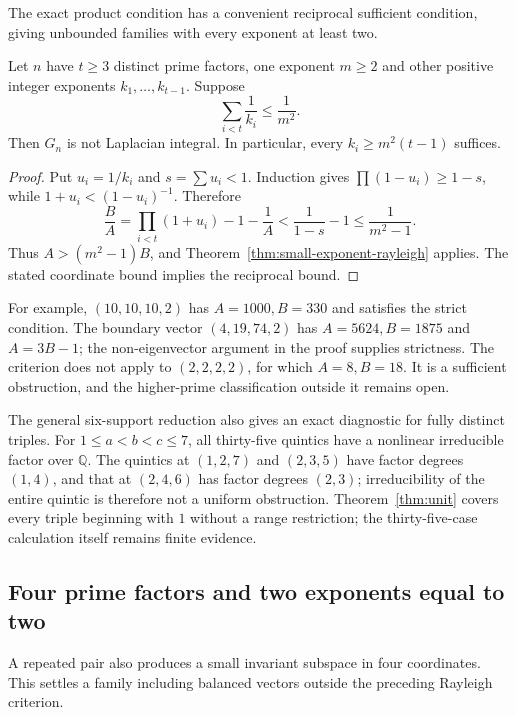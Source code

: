 The exact product condition has a convenient reciprocal sufficient
condition, giving unbounded families with every exponent at least two.

\begin{corollary}
\label{cor:small-exponent-reciprocal}
Let $n$ have $t\geq3$ distinct prime factors, one exponent $m\geq2$
and other positive integer exponents $k_1,\ldots,k_{t-1}$.
Suppose
\[
 \sum_{i<t}\frac1{k_i}\leq\frac1{m^2}.
\]
Then $G_n$ is not Laplacian integral. In particular, every
$k_i\geq m^2(t-1)$ suffices.
\end{corollary}
\begin{proof}
Put $u_i=1/k_i$ and $s=\sum u_i<1$. Induction gives
$\prod(1-u_i)\geq1-s$, while $1+u_i<(1-u_i)^{-1}$. Therefore
\[
 \frac BA=\prod_{i<t}(1+u_i)-1-\frac1A
 <\frac1{1-s}-1\leq\frac1{m^2-1}.
\]
Thus $A>(m^2-1)B$, and Theorem~\ref{thm:small-exponent-rayleigh}
applies. The stated coordinate bound implies the reciprocal bound.
\end{proof}

For example, $(10,10,10,2)$ has $A=1000,B=330$ and satisfies
the strict condition. The boundary vector $(4,19,74,2)$ has
$A=5624,B=1875$ and $A=3B-1$; the non-eigenvector argument in the
proof supplies strictness. The criterion does not apply to
$(2,2,2,2)$, for which $A=8,B=18$. It is a sufficient obstruction,
and the higher-prime classification outside it remains open.

The general six-support reduction also gives an exact diagnostic for
fully distinct triples. For $1\leq a<b<c\leq7$, all thirty-five quintics
have a nonlinear irreducible factor over $\mathbb Q$. The quintics
at $(1,2,7)$ and $(2,3,5)$ have factor degrees $(1,4)$, and that at
$(2,4,6)$ has factor degrees $(2,3)$;
irreducibility of the entire quintic is therefore not a
uniform obstruction. Theorem~\ref{thm:unit} covers every triple beginning
with $1$ without a range restriction; the thirty-five-case calculation
itself remains finite evidence.

\subsection{Four prime factors and two exponents equal to two}

A repeated pair also produces a small invariant subspace in four
coordinates. This settles a family including balanced vectors outside
the preceding Rayleigh criterion.

